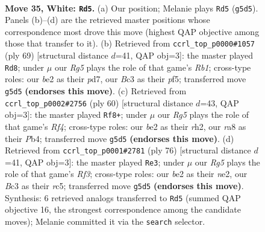 \documentclass[11pt]{article}
\begin{document}
\clearpage

\begin{figure}[p]\centering
\begin{subfigure}{0.46\textwidth}\centering
\resizebox{\linewidth}{!}{%
\newchessgame
\chessboard[
  setfen={rn6/5k1r/p7/6R1/1P3P2/2B3K1/P3b3/R7 w - - 3 35},
  showmover=false,
  pgfstyle=straightmove, color=movearrow, markmove={g5-d5}
]}
\caption{}
\end{subfigure}\hfill
\begin{subfigure}{0.46\textwidth}\centering
\resizebox{\linewidth}{!}{%
\newchessgame
\chessboard[
  setfen={1r3k2/3P4/7p/2p2P2/1p6/1B4bP/6P1/5R1K b - - 0 35},
  showmover=false,
  pgfstyle=straightmove, color=movearrow, markmove={b8-d8}
]}
\caption{}
\end{subfigure}
\\[4pt]
\begin{subfigure}{0.46\textwidth}\centering
\resizebox{\linewidth}{!}{%
\newchessgame
\chessboard[
  setfen={7k/p7/6pp/3B4/1P1bPR2/8/P6r/5K2 w - - 0 31},
  showmover=false,
  pgfstyle=straightmove, color=movearrow, markmove={f4-f8}
]}
\caption{}
\end{subfigure}\hfill
\begin{subfigure}{0.46\textwidth}\centering
\resizebox{\linewidth}{!}{%
\newchessgame
\chessboard[
  setfen={5r2/1R1B3p/5k2/2rp1P1p/8/5R2/P3n1PK/8 w - - 4 39},
  showmover=false,
  pgfstyle=straightmove, color=movearrow, markmove={f3-e3}
]}
\caption{}
\end{subfigure}
\caption{\textbf{Move 35, White: \texttt{Rd5}.} (a) Our position; Melanie plays \texttt{Rd5} (\texttt{g5d5}). Panels (b)--(d) are the retrieved master positions whose correspondence most drove this move (highest QAP objective among those that transfer to it). (b) Retrieved from \texttt{ccrl\_top\_p0000\#1057} (ply 69) [structural distance $d$=41, QAP obj=3]: the master played \texttt{Rd8}; under $\mu$ our \emph{Rg5} plays the role of that game's \emph{Rb1}; cross-type roles: our \emph{b}e2 as their \emph{p}d7, our \emph{B}c3 as their \emph{p}f5; transferred move \texttt{g5d5} \textbf{(endorses this move)}. (c) Retrieved from \texttt{ccrl\_top\_p0002\#2756} (ply 60) [structural distance $d$=43, QAP obj=3]: the master played \texttt{Rf8+}; under $\mu$ our \emph{Rg5} plays the role of that game's \emph{Rf4}; cross-type roles: our \emph{b}e2 as their \emph{r}h2, our \emph{r}a8 as their \emph{P}b4; transferred move \texttt{g5d5} \textbf{(endorses this move)}. (d) Retrieved from \texttt{ccrl\_top\_p0001\#2781} (ply 76) [structural distance $d$=41, QAP obj=3]: the master played \texttt{Re3}; under $\mu$ our \emph{Rg5} plays the role of that game's \emph{Rf3}; cross-type roles: our \emph{b}e2 as their \emph{n}e2, our \emph{B}c3 as their \emph{r}c5; transferred move \texttt{g5d5} \textbf{(endorses this move)}. Synthesis: 6 retrieved analogs transferred to \texttt{Rd5} (summed QAP objective 16, the strongest correspondence among the candidate moves); Melanie committed it via the \texttt{search} selector.}
\label{fig:thought-m68}
\end{figure}
\end{document}
